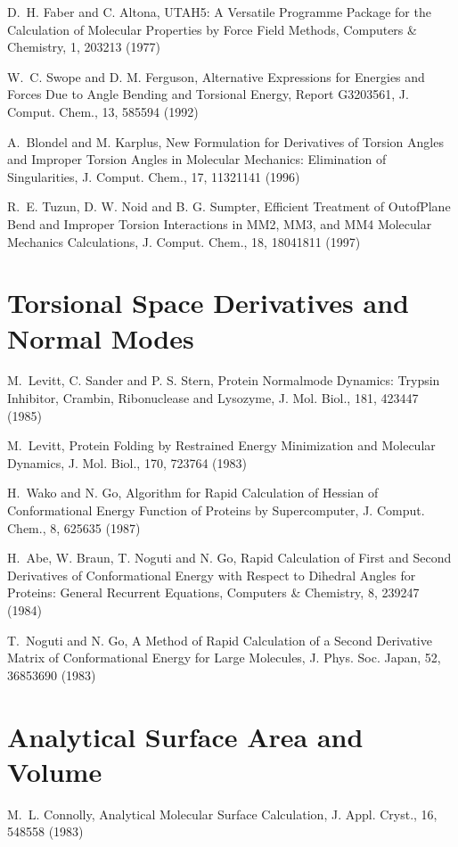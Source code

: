 \documentclass[letterpaper,11pt,english]{sphinxmanual}
\begin{document}
D. H. Faber and C. Altona, UTAH5: A Versatile Programme Package for the Calculation of Molecular Properties by Force Field Methods, Computers \& Chemistry, 1, 203\sphinxhyphen{}213 (1977)

W. C. Swope and D. M. Ferguson, Alternative Expressions for Energies and Forces Due to Angle Bending and Torsional Energy, Report G320\sphinxhyphen{}3561, J. Comput. Chem., 13, 585\sphinxhyphen{}594 (1992)

A. Blondel and M. Karplus, New Formulation for Derivatives of Torsion Angles and Improper Torsion Angles in Molecular Mechanics: Elimination of Singularities, J. Comput. Chem., 17, 1132\sphinxhyphen{}1141 (1996)

R. E. Tuzun, D. W. Noid and B. G. Sumpter, Efficient Treatment of Out\sphinxhyphen{}of\sphinxhyphen{}Plane Bend and Improper Torsion Interactions in MM2, MM3, and MM4 Molecular Mechanics Calculations, J. Comput. Chem., 18, 1804\sphinxhyphen{}1811 (1997)


\section{Torsional Space Derivatives and Normal Modes}
\label{\detokenize{text/references:torsional-space-derivatives-and-normal-modes}}
M. Levitt, C. Sander and P. S. Stern, Protein Normal\sphinxhyphen{}mode Dynamics:  Trypsin Inhibitor, Crambin, Ribonuclease and Lysozyme, J. Mol. Biol., 181, 423\sphinxhyphen{}447 (1985)

M. Levitt, Protein Folding by Restrained Energy Minimization and Molecular Dynamics, J. Mol. Biol., 170, 723\sphinxhyphen{}764 (1983)

H. Wako and N. Go, Algorithm for Rapid Calculation of Hessian of Conformational Energy Function of Proteins by Supercomputer, J. Comput. Chem., 8, 625\sphinxhyphen{}635 (1987)

H. Abe, W. Braun, T. Noguti and N. Go, Rapid Calculation of First and Second Derivatives of Conformational Energy with Respect to Dihedral Angles for Proteins: General Recurrent Equations, Computers \& Chemistry, 8, 239\sphinxhyphen{}247 (1984)

T. Noguti and N. Go, A Method of Rapid Calculation of a Second Derivative Matrix of Conformational Energy for Large Molecules, J. Phys. Soc. Japan, 52, 3685\sphinxhyphen{}3690 (1983)


\section{Analytical Surface Area and Volume}
\label{\detokenize{text/references:analytical-surface-area-and-volume}}
M. L. Connolly, Analytical Molecular Surface Calculation, J. Appl. Cryst., 16, 548\sphinxhyphen{}558 (1983)
\end{document}
